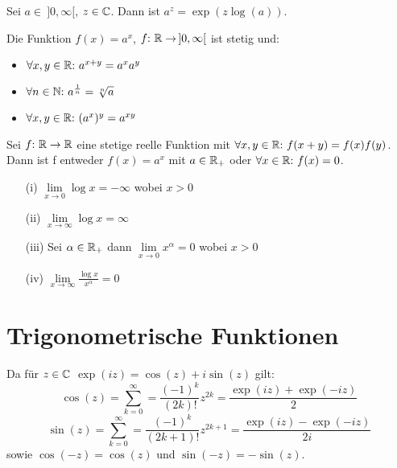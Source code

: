 \begin{frameddefn}
	Sei $a \in\  ]0,\infty[$, $z \in \mathbb{C}$. Dann ist $a^z = \exp(z \log(a))$.
\end{frameddefn}

\begin{framedthm}
	Die Funktion $f(x) = a^x$, $f{:}\  \mathbb{R} \to\, ]0,\infty[$ ist stetig und:
	\begin{itemize}
		\item $\forall x,y \in \mathbb{R}{:}\  a^{x+y} = a^x a^y$
		\item $\forall n \in \mathbb{N}{:}\  a^{\frac{1}{n}} = \sqrt[n]{a}$
		\item $\forall x,y \in \mathbb{R}{:}\  (a^x)^y = a^{xy}$
	\end{itemize}
\end{framedthm}

\begin{framedthm}
	Sei $f{:}\  \mathbb{R} \to \mathbb{R}$ eine stetige reelle Funktion mit $\forall x,y \in \mathbb{R}{:}\  f(x+y) = f(x) f(y)$.
	Dann ist f entweder $f(x) = a^x$ mit $a \in \mathbb{R}_+$ oder $\forall x \in \mathbb{R}{:}\  f(x) = 0$.
\end{framedthm}

\begin{framedquest}
	\begin{enumerate}
		\item [(i)] $\lim\limits_{x \to 0} \log x = - \infty$ wobei $x > 0$
		\item [(ii)] $\lim\limits_{x \to \infty} \log x = \infty$
		\item [(iii)] Sei $\alpha \in \mathbb{R}_+$ dann $\lim\limits_{x \to 0} x^{\alpha} = 0$ wobei $x > 0$
		\item [(iv)] $\lim\limits_{x \to \infty} \frac{\log x}{x^{\alpha}} = 0$
	\end{enumerate}
\end{framedquest}

\newpage
\section{Trigonometrische Funktionen}

\begin{frameddefn}
	Da für $z \in \mathbb{C}$ $\exp(iz) = \cos(z) + i \sin(z)$ gilt:
	\[
	\cos(z) = \sum_{k=0}^{\infty} = \frac{(-1)^k}{(2k)!} z^{2k} = \frac{\exp(iz)+\exp(-iz)}{2}
	\]
	\[
	\sin(z) = \sum_{k=0}^{\infty} = \frac{(-1)^k}{(2k + 1)!} z^{2k + 1} = \frac{\exp(iz)-\exp(-iz)}{2i}
	\]
	sowie $\cos(-z) = \cos(z)$ und $\sin(-z) = -\sin(z)$.
\end{frameddefn}

